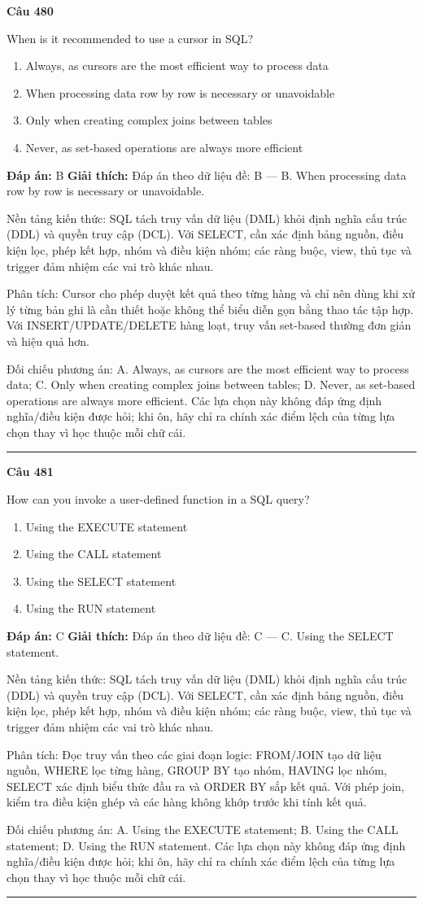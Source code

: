 \documentclass[11pt,a4paper]{article}
\newenvironment{question}[1]{%
  \par\vspace{1em}\noindent\textbf{\large Câu #1}\par\vspace{0.4em}
}{%
  \par\vspace{1em}\hrule\vspace{0.6em}
}
\newenvironment{choices}{%
  \begin{enumerate}[label=\textbf{\Alph*.},leftmargin=2.2em,itemsep=2pt,topsep=3pt]
}{%
  \end{enumerate}
}
\newcommand{\choice}{\item}
\begin{document}
\begin{question}{480}
When is it recommended to use a cursor in SQL?
\begin{choices}
\choice Always, as cursors are the most efficient way to process data
\choice When processing data row by row is necessary or unavoidable
\choice Only when creating complex joins between tables
\choice Never, as set-based operations are always more efficient
\end{choices}
\textbf{Đáp án:} B
\textbf{Giải thích:} Đáp án theo dữ liệu đề: B — B. When processing data row by row is necessary or unavoidable.

Nền tảng kiến thức: SQL tách truy vấn dữ liệu (DML) khỏi định nghĩa cấu trúc (DDL) và quyền truy cập (DCL). Với SELECT, cần xác định bảng nguồn, điều kiện lọc, phép kết hợp, nhóm và điều kiện nhóm; các ràng buộc, view, thủ tục và trigger đảm nhiệm các vai trò khác nhau.

Phân tích: Cursor cho phép duyệt kết quả theo từng hàng và chỉ nên dùng khi xử lý từng bản ghi là cần thiết hoặc không thể biểu diễn gọn bằng thao tác tập hợp. Với INSERT/UPDATE/DELETE hàng loạt, truy vấn set-based thường đơn giản và hiệu quả hơn.

Đối chiếu phương án: A. Always, as cursors are the most efficient way to process data; C. Only when creating complex joins between tables; D. Never, as set-based operations are always more efficient. Các lựa chọn này không đáp ứng định nghĩa/điều kiện được hỏi; khi ôn, hãy chỉ ra chính xác điểm lệch của từng lựa chọn thay vì học thuộc mỗi chữ cái.
\end{question}

\begin{question}{481}
How can you invoke a user-defined function in a SQL query?
\begin{choices}
\choice Using the EXECUTE statement
\choice Using the CALL statement
\choice Using the SELECT statement
\choice Using the RUN statement
\end{choices}
\textbf{Đáp án:} C
\textbf{Giải thích:} Đáp án theo dữ liệu đề: C — C. Using the SELECT statement.

Nền tảng kiến thức: SQL tách truy vấn dữ liệu (DML) khỏi định nghĩa cấu trúc (DDL) và quyền truy cập (DCL). Với SELECT, cần xác định bảng nguồn, điều kiện lọc, phép kết hợp, nhóm và điều kiện nhóm; các ràng buộc, view, thủ tục và trigger đảm nhiệm các vai trò khác nhau.

Phân tích: Đọc truy vấn theo các giai đoạn logic: FROM/JOIN tạo dữ liệu nguồn, WHERE lọc từng hàng, GROUP BY tạo nhóm, HAVING lọc nhóm, SELECT xác định biểu thức đầu ra và ORDER BY sắp kết quả. Với phép join, kiểm tra điều kiện ghép và các hàng không khớp trước khi tính kết quả.

Đối chiếu phương án: A. Using the EXECUTE statement; B. Using the CALL statement; D. Using the RUN statement. Các lựa chọn này không đáp ứng định nghĩa/điều kiện được hỏi; khi ôn, hãy chỉ ra chính xác điểm lệch của từng lựa chọn thay vì học thuộc mỗi chữ cái.
\end{question}
\end{document}
